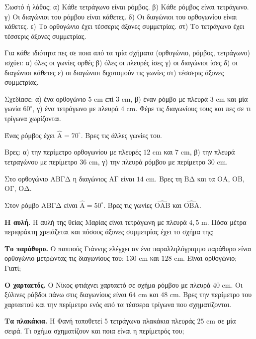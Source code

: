 

\ex Σωστό ή λάθος; α) Κάθε τετράγωνο είναι ρόμβος. β) Κάθε ρόμβος είναι τετράγωνο. γ) Οι διαγώνιοι του ρόμβου είναι κάθετες. δ) Οι διαγώνιοι του ορθογωνίου είναι κάθετες. ε) Το ορθογώνιο έχει τέσσερις άξονες συμμετρίας. στ) Το τετράγωνο έχει τέσσερις άξονες συμμετρίας.

\ex Για κάθε ιδιότητα πες σε ποια από τα τρία σχήματα (ορθογώνιο, ρόμβος, τετράγωνο) ισχύει: α) όλες οι γωνίες ορθές β) όλες οι πλευρές ίσες γ) οι διαγώνιοι ίσες δ) οι διαγώνιοι κάθετες ε) οι διαγώνιοι διχοτομούν τις γωνίες στ) τέσσερις άξονες συμμετρίας.

\ex Σχεδίασε: α) ένα ορθογώνιο $5$ cm επί $3$ cm, β) έναν ρόμβο με πλευρά $3$ cm και μία γωνία $60^\circ$, γ) ένα τετράγωνο με πλευρά $4$ cm. Φέρε τις διαγωνίους τους και πες σε τι τρίγωνα χωρίζονται.

\ex Ένας ρόμβος έχει $\hat{\mathrm{Α}}=70^\circ$. Βρες τις άλλες γωνίες του.

\ex Βρες: α) την περίμετρο ορθογωνίου με πλευρές $12$ cm και $7$ cm, β) την πλευρά τετραγώνου με περίμετρο $36$ cm, γ) την πλευρά ρόμβου με περίμετρο $30$ cm.

\ex Στο ορθογώνιο $\mathrm{ΑΒΓΔ}$ η διαγώνιος $\mathrm{ΑΓ}$ είναι $14$ cm. Βρες τη $\mathrm{ΒΔ}$ και τα $\mathrm{ΟΑ}$, $\mathrm{ΟΒ}$, $\mathrm{ΟΓ}$, $\mathrm{ΟΔ}$.

\ex Στον ρόμβο $\mathrm{ΑΒΓΔ}$ είναι $\hat{\mathrm{Α}}=50^\circ$. Βρες τις γωνίες $\widehat{\mathrm{ΟΑΒ}}$ και $\widehat{\mathrm{ΟΒΑ}}$.


\ex \textbf{Η αυλή.} Η αυλή της θείας Μαρίας είναι τετράγωνη με πλευρά $4{,}5$ m. Πόσα μέτρα περιφράκτη χρειάζεται και πόσους άξονες συμμετρίας έχει το σχήμα της;

\ex \textbf{Το παράθυρο.} Ο παππούς Γιάννης ελέγχει αν ένα παραλληλόγραμμο παράθυρο είναι ορθογώνιο μετρώντας τις διαγωνίους του: $130$ cm και $128$ cm. Είναι ορθογώνιο; Γιατί;

\ex \textbf{Ο χαρταετός.} Ο Νίκος φτιάχνει χαρταετό σε σχήμα ρόμβου με πλευρά $40$ cm. Οι ξύλινες ράβδοι πάνω στις διαγωνίους είναι $64$ cm και $48$ cm. Βρες την περίμετρο του χαρταετού και την περίμετρο ενός από τα τέσσερα τρίγωνα που σχηματίζονται.

\ex \textbf{Τα πλακάκια.} Η Φανή τοποθετεί $5$ τετράγωνα πλακάκια πλευράς $25$ cm σε μία σειρά. Τι σχήμα σχηματίζουν και ποια είναι η περίμετρός του;

